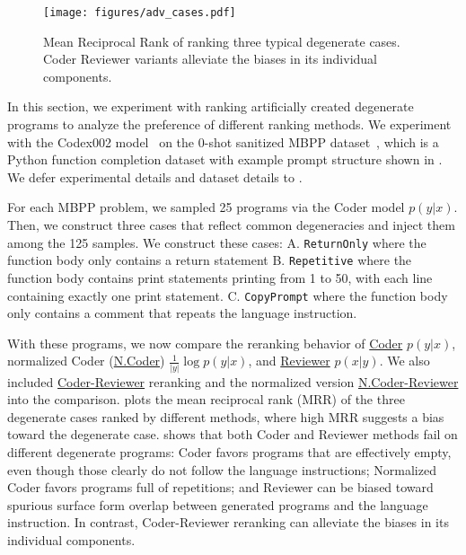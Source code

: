 \documentclass[nohyperref]{article}
\theoremstyle{plain}
\theoremstyle{definition}
\theoremstyle{remark}
\begin{document}
\begin{figure}[]
     \centering
     \texttt{[image: figures/adv\_cases.pdf]}
     \caption{Mean Reciprocal Rank of ranking three typical degenerate cases. Coder Reviewer variants alleviate the biases in its individual components.}
     \label{fig:adv_cases}
     \vspace{-10pt}
\end{figure}
In this section, we experiment with ranking artificially created degenerate programs to analyze the preference of different ranking methods.
We experiment with the Codex002 model~\citep{codex} on the 0-shot sanitized MBPP dataset~\citep[MBPP-S][]{mbpp}, which is a Python function completion dataset with example prompt structure shown in .
We defer experimental details and dataset details to .

For each MBPP problem, we sampled 25 programs via the Coder model $p(y|x)$.
Then, we construct three cases that reflect common degeneracies and inject them among the 125 samples.
We construct these cases:
A. \texttt{ReturnOnly} where the function body only contains a return statement 
B. \texttt{Repetitive} where the function body contains print statements printing from 1 to 50, with each line containing exactly one print statement.
C. \texttt{CopyPrompt} where the function body only contains a comment that repeats the language instruction.

With these programs, we now compare the reranking behavior of \underline{Coder} $p(y|x)$, normalized Coder (\underline{N.Coder}) $\frac{1}{\lvert y \rvert}\log p(y|x)$, and \underline{Reviewer} $p(x|y)$.
We also included \underline{Coder-Reviewer} reranking and the normalized version \underline{N.Coder-Reviewer} into the comparison.
 plots the mean reciprocal rank (MRR) of the three degenerate cases ranked by different methods, where high MRR suggests a bias toward the degenerate case.
 shows that both Coder and Reviewer methods fail on different degenerate programs: Coder favors programs that are effectively empty, even though those clearly do not follow the language instructions; Normalized Coder favors programs full of repetitions; and Reviewer can be biased toward spurious surface form overlap between generated programs and the language instruction.
In contrast, Coder-Reviewer reranking can alleviate the biases in its individual components.
\end{document}
